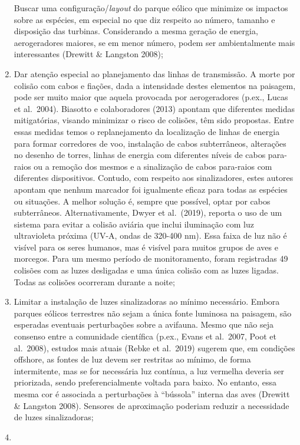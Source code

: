 \documentclass[
]{scrbook}
\begin{document}
\begin{enumerate}
  Buscar uma configuração/\emph{layout} do parque eólico que minimize os impactos sobre as espécies, em especial no que diz respeito ao número, tamanho e disposição das turbinas. Considerando a mesma geração de energia, aerogeradores maiores, se em menor número, podem ser ambientalmente mais interessantes (Drewitt \& Langston 2008);
\item
  Dar atenção especial ao planejamento das linhas de transmissão. A morte por colisão com cabos e fiações, dada a intensidade destes elementos na paisagem, pode ser muito maior que aquela provocada por aerogeradores (p.ex., Lucas et al.~2004). Biasotto e colaboradores (2013) apontam que diferentes medidas mitigatórias, visando minimizar o risco de colisões, têm sido propostas. Entre essas medidas temos o replanejamento da localização de linhas de energia para formar corredores de voo, instalação de cabos subterrâneos, alterações no desenho de torres, linhas de energia com diferentes níveis de cabos para-raios ou a remoção dos mesmos e a sinalização de cabos para-raios com diferentes dispositivos. Contudo, com respeito aos sinalizadores, estes autores apontam que nenhum marcador foi igualmente eficaz para todas as espécies ou situações. A melhor solução é, sempre que possível, optar por cabos subterrâneos. Alternativamente, Dwyer et al.~(2019), reporta o uso de um sistema para evitar a colisão aviária que inclui iluminação com luz ultravioleta próxima (UV-A, ondas de 320-400 nm). Essa faixa de luz não é visível para os seres humanos, mas é visível para muitos grupos de aves e morcegos. Para um mesmo período de monitoramento, foram registradas 49 colisões com as luzes desligadas e uma única colisão com as luzes ligadas. Todas as colisões ocorreram durante a noite;
\item
  Limitar a instalação de luzes sinalizadoras ao mínimo necessário. Embora parques eólicos terrestres não sejam a única fonte luminosa na paisagem, são esperadas eventuais perturbações sobre a avifauna. Mesmo que não seja consenso entre a comunidade científica (p.ex., Evans et al.~2007, Poot et al.~2008), estudos mais atuais (Rebke et al.~2019) sugerem que, em condições offshore, as fontes de luz devem ser restritas ao mínimo, de forma intermitente, mas se for necessária luz contínua, a luz vermelha deveria ser priorizada, sendo preferencialmente voltada para baixo. No entanto, essa mesma cor é associada a perturbações à ``bússola'' interna das aves (Drewitt \& Langston 2008). Sensores de aproximação poderiam reduzir a necessidade de luzes sinalizadoras;
\item

\end{enumerate}
\end{document}
